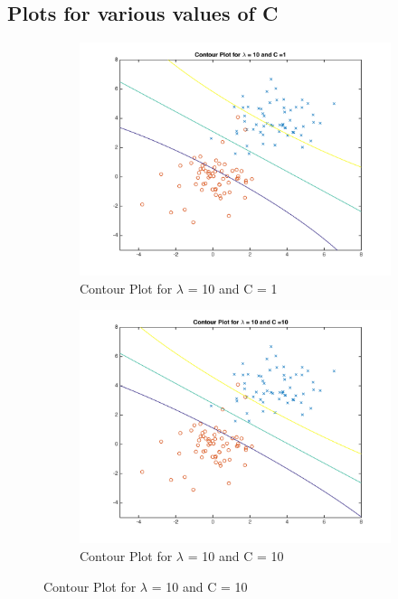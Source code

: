 \documentclass[english]{article}
\begin{document}
\subsection{Plots for various values of C}
\begin{figure}[!htbp]
\begin{subfigure}{0.48\textwidth}
\includegraphics[width=\linewidth]{../plotC/plot_C_1}
\caption{Contour Plot for $\lambda$ = 10 and C = 1} 
\end{subfigure}\hspace*{\fill}
\begin{subfigure}{0.48\textwidth}
\includegraphics[width=\linewidth]{../plotC/plot_C_10}
\caption{Contour Plot for $\lambda$ = 10 and C = 10} \label{fig:b}
\end{subfigure}


\end{figure}
\end{document}

